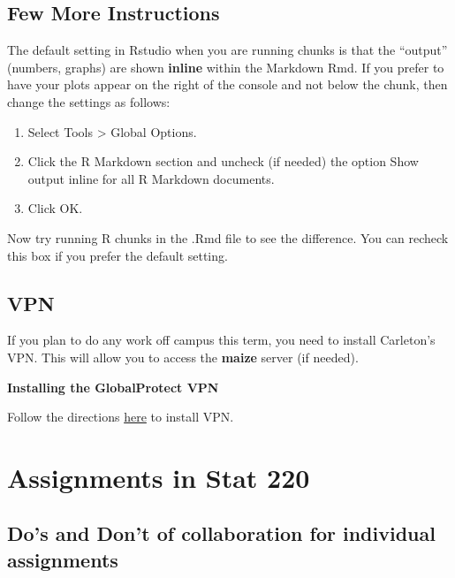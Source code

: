 \documentclass[
]{book}
\providecommand{\tightlist}{%
  \setlength{\itemsep}{0pt}\setlength{\parskip}{0pt}}
\begin{document}
\hypertarget{few-more-instructions}{%
\section{Few More Instructions}\label{few-more-instructions}}

The default setting in Rstudio when you are running chunks is that the ``output'' (numbers, graphs) are
shown \textbf{inline} within the Markdown Rmd. If you prefer to have your plots appear on the right of the console and not below the chunk, then change the settings as follows:

\begin{enumerate}
\def\labelenumi{\arabic{enumi}.}
\tightlist
\item
  Select Tools \textgreater{} Global Options.
\item
  Click the R Markdown section and uncheck (if needed) the option Show output inline for all
  R Markdown documents.
\item
  Click OK.
\end{enumerate}

Now try running R chunks in the .Rmd file to see the difference. You can recheck this box if you prefer
the default setting.

\hypertarget{vpn}{%
\section{VPN}\label{vpn}}

If you plan to do any work off campus this term, you need to install Carleton's VPN. This will allow you to access the \textbf{maize} server (if needed).

\textbf{Installing the GlobalProtect VPN}

Follow the directions \href{https://wiki.carleton.edu/display/itskb/GlobalProtect+VPN}{here} to install VPN.

\hypertarget{assignments}{%
\chapter{Assignments in Stat 220}\label{assignments}}

\hypertarget{dos-and-dont-of-collaboration-for-individual-assignments}{%
\section{Do's and Don't of collaboration for individual assignments}\label{dos-and-dont-of-collaboration-for-individual-assignments}}
\end{document}
